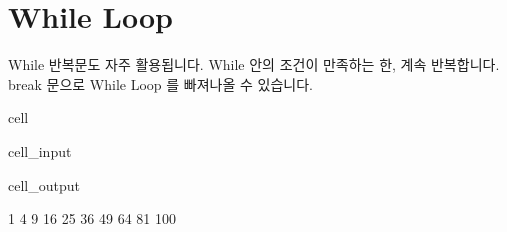 \documentclass[letterpaper,10pt,english]{jupyterBook}
\begin{document}
\section{While Loop}
\label{\detokenize{chapter2/2.1.3_Python_Basics:while-loop}}
\sphinxAtStartPar
While 반복문도 자주 활용됩니다. While 안의 조건이 만족하는 한, 계속 반복합니다. break 문으로 While Loop 를 빠져나올 수 있습니다.

\begin{sphinxuseclass}{cell}\begin{sphinxVerbatimInput}

\begin{sphinxuseclass}{cell_input}
\begin{sphinxVerbatim}[commandchars=\\\{\}]
  
        
       
\end{sphinxVerbatim}

\end{sphinxuseclass}\end{sphinxVerbatimInput}
\begin{sphinxVerbatimOutput}

\begin{sphinxuseclass}{cell_output}
\begin{sphinxVerbatim}[commandchars=\\\{\}]
1
4
9
16
25
36
49
64
81
100
\end{sphinxVerbatim}

\end{sphinxuseclass}\end{sphinxVerbatimOutput}

\end{sphinxuseclass}
\end{document}
